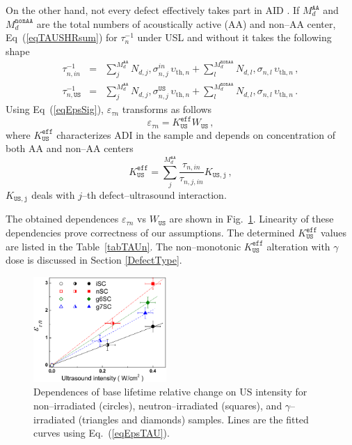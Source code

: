 \documentclass[aip,jap, amsmath,amssymb,reprint]{revtex4-1}
\begin{document}
On the other hand, not every defect effectively takes part in AID .
If  $M_d^\mathtt{AA}$ and $M_d^\mathtt{nonAA}$ are the total numbers of acoustically active (AA) and non--AA center,
Eq~(\ref{eqTAUSHRsum}) for $\tau_{n}^{-1}$ under USL and without it takes the following shape
\begin{eqnarray}
\tau_{n,in}^{-1}&=&\sum_j^{M_d^\mathtt{AA}}N_{d,j},\sigma_{n,j}^{in}\,\upsilon_{\mathrm{th},n}+
\sum_l^{M_d^\mathtt{nonAA}}N_{d,l},\sigma_{n,l}\,\upsilon_{\mathrm{th},n}\,,\nonumber\\
\tau_{n,\mathtt{US}}^{-1}&=&\sum_j^{M_d^\mathtt{AA}}N_{d,j},\sigma_{n,j}^\mathtt{US}\,\upsilon_{\mathrm{th},n}+
\sum_l^{M_d^\mathtt{nonAA}}N_{d,l},\sigma_{n,l}\,\upsilon_{\mathrm{th},n}\,.\nonumber
\end{eqnarray}
Using Eq~(\ref{eqEpsSig}), $\varepsilon_{\tau n}$  transforms as follows
\begin{equation}
\label{eqEpsTAU}
\varepsilon_{\tau n}=K_\mathtt{US}^\mathtt{eff}W_\mathtt{US}\,,
\end{equation}
where $K_\mathtt{US}^\mathtt{eff}$ characterizes ADI in the sample
and depends on concentration of both AA and non--AA centers
\begin{equation}
\label{eqKeff}
K_\mathtt{US}^\mathtt{eff}=\sum_j^{M_d^\mathtt{AA}}\frac{\tau_{n,in}}{\tau_{n,j,in}}K_\mathtt{US,j}\,,
\end{equation}
$K_\mathtt{US,j}$ deals with $j$--th defect--ultrasound interaction.

The obtained dependences $\varepsilon_{\tau n}$ vs $W_\mathtt{US}$ are shown in Fig.~\ref{fig_Kus}.
Linearity of these dependencies prove correctness of our assumptions.
The determined $K_\mathtt{US}^\mathtt{eff}$ values are listed in the Table~\ref{tabTAUn}.
The non--monotonic $K_\mathtt{US}^\mathtt{eff}$ alteration with $\gamma$ dose
is discussed in Section \ref{DefectType}.

\begin{figure}
\includegraphics[width=0.45\textwidth]{fig_8}%
\caption{\label{fig_Kus}
Dependences of base lifetime relative change on US intensity for non--irradiated (circles), neutron--irradiated (squares), and $\gamma$--irradiated
(triangles and diamonds) samples.
Lines are the fitted curves using Eq.~(\ref{eqEpsTAU}).
}%
\end{figure}
\end{document}
